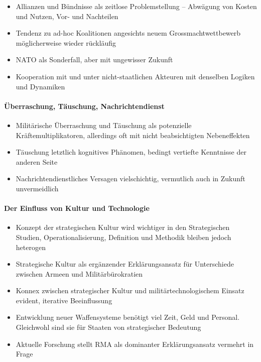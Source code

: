 {}\documentclass[a4paper]{article}
\providecommand{\tightlist}{\setlength{\itemsep}{1mm}\setlength{\parskip}{1mm}}
\begin{document}
\begin{itemize}
	\tightlist
	\item
	      Allianzen und Bündnisse als zeitlose Problemstellung -- Abwägung von
	      Kosten und Nutzen, Vor- und Nachteilen
	\item
	      Tendenz zu ad-hoc Koalitionen angesichts neuem Grossmachtwettbewerb
	      möglicherweise wieder rückläufig
	\item
	      NATO als Sonderfall, aber mit ungewisser Zukunft
	\item
	      Kooperation mit und unter nicht-staatlichen Akteuren mit denselben
	      Logiken und Dynamiken
\end{itemize}

\paragraph{Überraschung, Täuschung,
	Nachrichtendienst}\label{uxfcberraschung-tuxe4uschung-nachrichtendienst}

\begin{itemize}
	\tightlist
	\item
	      Militärische Überraschung und Täuschung als potenzielle
	      Kräftemultiplikatoren, allerdings oft mit nicht beabsichtigten
	      Nebeneffekten
	\item
	      Täuschung letztlich kognitives Phänomen, bedingt vertiefte Kenntnisse
	      der anderen Seite
	\item
	      Nachrichtendienstliches Versagen vielschichtig, vermutlich auch in
	      Zukunft unvermeidlich
\end{itemize}

\paragraph{Der Einfluss von Kultur und
	Technologie}\label{der-einfluss-von-kultur-und-technologie}

\begin{itemize}
	\tightlist
	\item
	      Konzept der strategischen Kultur wird wichtiger in den Strategischen
	      Studien, Operationalisierung, Definition und Methodik bleiben jedoch
	      heterogen
	\item
	      Strategische Kultur als ergänzender Erklärungsansatz für Unterschiede
	      zwischen Armeen und Militärbürokratien
	\item
	      Konnex zwischen strategischer Kultur und militärtechnologischem
	      Einsatz evident, iterative Beeinflussung
	\item
	      Entwicklung neuer Waffensysteme benötigt viel Zeit, Geld und Personal.
	      Gleichwohl sind sie für Staaten von strategischer Bedeutung
	\item
	      Aktuelle Forschung stellt RMA als dominanter Erklärungsansatz vermehrt
	      in Frage
\end{itemize}
\end{document}
